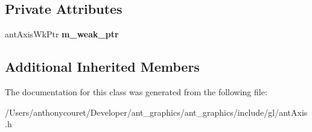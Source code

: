 \subsection*{Private Attributes}
\begin{DoxyCompactItemize}
\item 
\hypertarget{classant_axis_a2dc7112e89e7f094bca368b4c4437709}{ant\+Axis\+Wk\+Ptr {\bfseries m\+\_\+weak\+\_\+ptr}}\label{classant_axis_a2dc7112e89e7f094bca368b4c4437709}

\end{DoxyCompactItemize}
\subsection*{Additional Inherited Members}


The documentation for this class was generated from the following file\+:\begin{DoxyCompactItemize}
\item 
/\+Users/anthonycouret/\+Developer/ant\+\_\+graphics/ant\+\_\+graphics/include/gl/ant\+Axis.\+h\end{DoxyCompactItemize}
